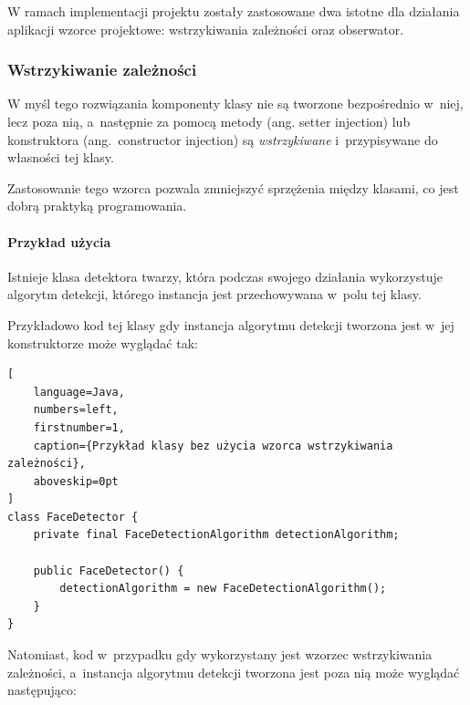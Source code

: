 W ramach implementacji projektu zostały zastosowane dwa istotne dla działania aplikacji wzorce projektowe: wstrzykiwania zależności oraz obserwator. 


\subsubsection{Wstrzykiwanie zależności}

W myśl tego rozwiązania komponenty klasy nie są tworzone bezpośrednio w~niej, lecz poza nią, a~następnie za pomocą metody (ang. setter injection) lub konstruktora (ang.~constructor injection) są \textit{wstrzykiwane} i~przypisywane do własności tej klasy. 

\par

Zastosowanie tego wzorca pozwala zmniejszyć sprzężenia między klasami, co jest dobrą praktyką programowania. 




\paragraph{Przykład użycia} Istnieje klasa detektora twarzy, która podczas swojego działania wykorzystuje algorytm detekcji, którego instancja jest przechowywana w~polu tej klasy.

\par

Przykładowo kod tej klasy gdy instancja algorytmu detekcji tworzona jest w~jej konstruktorze może wyglądać tak:

\vspace{5mm}

\begin{addmargin}[10mm]{0mm}
\begin{lstlisting}[
    language=Java,
    numbers=left,
    firstnumber=1,
    caption={Przykład klasy bez użycia wzorca wstrzykiwania zależności},
    aboveskip=0pt
]
class FaceDetector {
    private final FaceDetectionAlgorithm detectionAlgorithm;
    
    public FaceDetector() {
        detectionAlgorithm = new FaceDetectionAlgorithm();
    }
}
\end{lstlisting}
\end{addmargin}

\vspace{5mm}

Natomiast, kod w~przypadku gdy wykorzystany jest wzorzec wstrzykiwania zależności, a~instancja algorytmu detekcji tworzona jest poza nią może wyglądać następująco:

